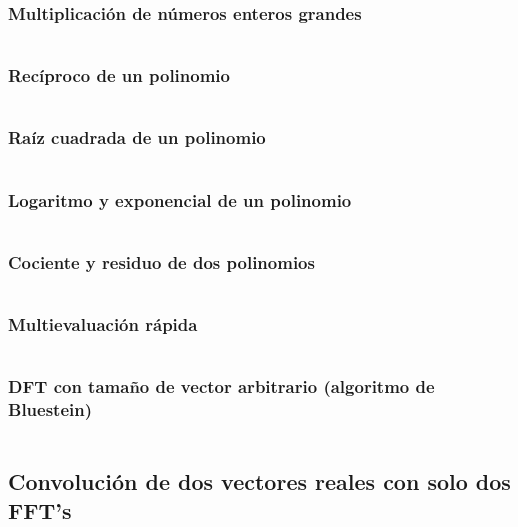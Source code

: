 \documentclass[11pt]{article}
\begin{document}
			\subsubsection{Multiplicación de números enteros grandes}
			\inputminted[tabsize=2,breaklines,firstline=112,lastline=145,fontsize=\small]{c++}{fft.cpp}
			
			\subsubsection{Recíproco de un polinomio}
			\inputminted[tabsize=2,breaklines,firstline=147,lastline=171,fontsize=\small]{c++}{fft.cpp}
			
			\subsubsection{Raíz cuadrada de un polinomio}
			\inputminted[tabsize=2,breaklines,firstline=173,lastline=195,fontsize=\small]{c++}{fft.cpp}
			
			\subsubsection{Logaritmo y exponencial de un polinomio}
			\inputminted[tabsize=2,breaklines,firstline=197,lastline=239,fontsize=\small]{c++}{fft.cpp}
			
			\subsubsection{Cociente y residuo de dos polinomios}
			\inputminted[tabsize=2,breaklines,firstline=241,lastline=266,fontsize=\small]{c++}{fft.cpp}
			
			\subsubsection{Multievaluación rápida}
			\inputminted[tabsize=2,breaklines,firstline=268,lastline=312,fontsize=\small]{c++}{fft.cpp}
			
			\subsubsection{DFT con tamaño de vector arbitrario (algoritmo de Bluestein)}
			\inputminted[tabsize=2,breaklines,firstline=314,lastline=334,fontsize=\small]{c++}{fft.cpp}
			
		\subsection{Convolución de dos vectores reales con solo dos FFT's}
		\inputminted[tabsize=2,breaklines,firstline=336,lastline=356,fontsize=\small]{c++}{fft.cpp}
			
\end{document}
